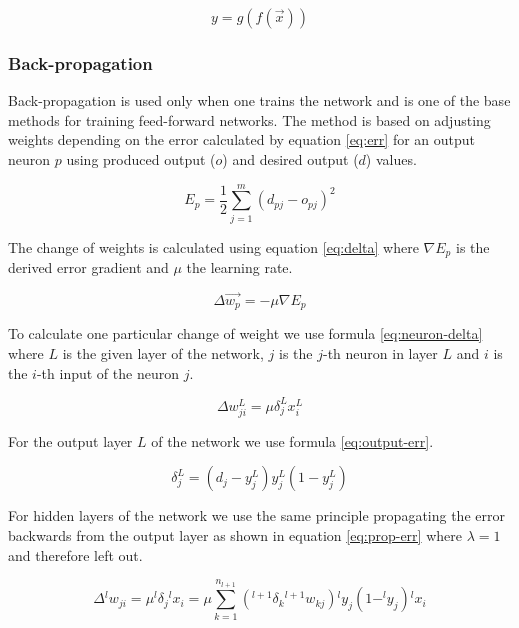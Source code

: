 \begin{equation}
    y = g( f( \vec{x} ) )
    \label{eq:output}
\end{equation}


\subsubsection{Back-propagation}
Back-propagation is used only when one trains the network and is one of the base methods for training feed-forward networks. The method is based on adjusting weights depending on the error calculated by equation \ref{eq:err} for an output neuron $ p $ using produced output ($ o $) and desired output ($ d $) values.

\begin{equation}
    E_p = \frac{1}{2} \sum_{j = 1}^{m} (d_{pj} - o_{pj})^2
    \label{eq:err}
\end{equation}

The change of weights is calculated using equation \ref{eq:delta} where $ \nabla E_p $ is the derived error gradient and $ \mu $ the learning rate.

\begin{equation}
    \Delta \vec{w_p} = -\mu \nabla E_p
    \label{eq:delta}
\end{equation}

To calculate one particular change of weight we use formula \ref{eq:neuron-delta} where $ L $ is the given layer of the network, $ j $ is the $j$-th neuron in layer $ L $ and $ i $ is the $i$-th input of the neuron $ j $.

\begin{equation}
    \Delta w_{ji}^L = \mu \delta_j^L x_i^L
    \label{eq:neuron-delta}
\end{equation}

For the output layer $ L $ of the network we use formula \ref{eq:output-err}.

\begin{equation}
    \delta_j^L = (d_j - y_j^L) y_j^L(1 - y_j^L)
    \label{eq:output-err}
\end{equation}

For hidden layers of the network we use the same principle propagating the error backwards from the output layer as shown in equation \ref{eq:prop-err} where $\lambda = 1$ and therefore left out.

\begin{equation}
    \Delta {^l w}_{ji} = \mu {^l\delta}_j {^lx}_i = \mu \sum_{k = 1}^{n_{l+1}} (^{l+1}\delta_k {^{l+1}w}_{kj}) {^ly}_j (1 - ^ly_j){^lx}_i
    \label{eq:prop-err}
\end{equation}

